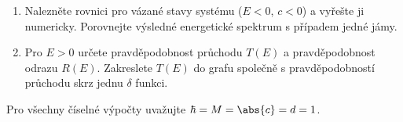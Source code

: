 \documentclass[a4paper,11pt,twoside]{book}
\begin{document}
    \begin{enumerate}
    \item
        Nalezněte rovnici pro vázané stavy systému ($E<0$, $c<0$) a vyřešte ji numericky.
        Porovnejte výsledné energetické spektrum s případem jedné jámy.
        
    \item
        Pro $E>0$ určete pravděpodobnost průchodu $T(E)$ a pravděpodobnost odrazu $R(E)$.
        Zakreslete $T(E)$ do grafu společně s pravděpodobností průchodu skrz jednu $\delta$ funkci.
        
    \end{enumerate}
    
    Pro všechny číselné výpočty uvažujte $\hbar=M=\abs{c}=d=1$.
        
\end{document}
